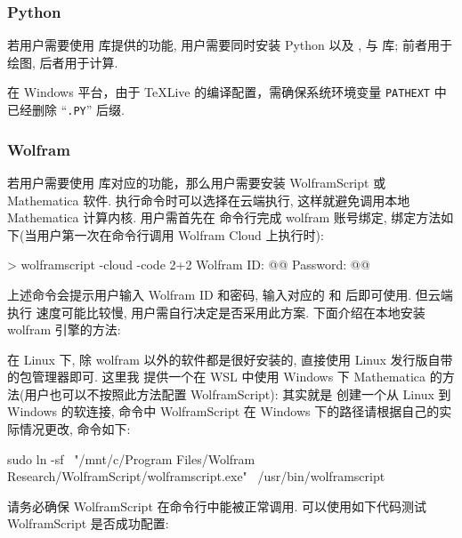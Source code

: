 \documentclass[
  hyper, lang=cn, 
  class=l3dox, 
]{../../zlatex/code/ztex}
\begin{document}
\vspace*{-.5em}
\subsubsection{Python}
若用户需要使用  库提供的功能, 用户需要同时安装 Python 以及 , 
 与  库; 前者用于绘图, 后者用于计算.

在 Windows 平台，由于 \TeX{}Live 的编译配置，需确保系统环境变量 \texttt{PATHEXT} 中已经删除 ``\texttt{.PY}'' 后缀. 

\vspace*{-.5em}
\subsubsection{Wolfram}
若用户需要使用  库对应的功能，那么用户需要安装 WolframScript 或
Mathematica 软件. 执行命令时可以选择在云端执行, 这样就避免调用本地 Mathematica 计算内核. 用户需首先在
命令行完成 wolfram 账号绑定, 绑定方法如下(当用户第一次在命令行调用 Wolfram Cloud 上执行时):
\begin{DocExample}[@@]
> wolframscript -cloud -code 2+2
Wolfram ID: @@
Password: @@
\end{DocExample}

上述命令会提示用户输入 Wolfram ID 和密码, 输入对应的  和  后即可使用. 但云端执行
速度可能比较慢, 用户需自行决定是否采用此方案. 下面介绍在本地安装 wolfram 引擎的方法:


在 Linux 下, 除 wolfram 以外的软件都是很好安装的, 直接使用 Linux 发行版自带的包管理器即可. 这里我
提供一个在 WSL 中使用 Windows 下 Mathematica 的方法(用户也可以不按照此方法配置 WolframScript): 其实就是
创建一个从 Linux 到 Windows 的软连接, 命令中 WolframScript 在 Windows 下的路径请根据自己的实际情况更改, 命令如下:

\begin{DocExample}[@@]
sudo ln -sf \
  "/mnt/c/Program Files/Wolfram Research/WolframScript/wolframscript.exe" \
  /usr/bin/wolframscript  
\end{DocExample}


请务必确保 WolframScript 在命令行中能被正常调用. 可以使用如下代码测试 WolframScript 是否成功配置: 
\end{document}
